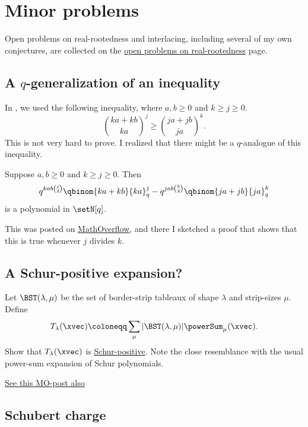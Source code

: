 

\section[personalMinorProblems]{Minor problems}


Open problems on real-rootedness and interlacing, including several of my
own conjectures, are collected on the
\hyperref[realrootedOpenProblems]{open problems on real-rootedness} page.


\subsection[qInequality]{A $q$-generalization of an inequality}

In \cite{AlexanderssonAmini2018}, we used the following inequality,
where $a,b\geq 0$ and $k \geq j \ge 0$.
\[
\binom{ka+kb}{ka}^j \geq \binom{ja+jb}{ja}^k.
\]
This is not very hard to prove. I realized that there might be a $q$-analogue of this inequality.

\begin{conjecture}[Alexandersson, 2019]
Suppose $a,b\geq 0$ and $k \geq j \ge 0$. Then
\[
q^{kab \binom{j}{2}} \qbinom{ka+kb}{ka}_q^j -  q^{jab \binom{k}{2}} \qbinom{ja+jb}{ja}_q^k
\]
is a polynomial in $\setN[q]$.
\end{conjecture}

This was posted on \href{https://mathoverflow.net/questions/330620/q-analogue-of-an-inequality}{MathOverflow},
and there I sketched a proof that shows that this is true whenever $j$ divides $k$.


\subsection[schurPositive]{A Schur-positive expansion?}

Let $\BST(\lambda,\mu)$ be the set of border-strip tableaux of shape $\lambda$
and strip-sizes $\mu$.
Define
\[
T_\lambda(\xvec) \coloneqq \sum_{\mu} |\BST(\lambda,\mu)| \powerSum_\mu(\xvec).
\]
Show that $T_\lambda(\xvec)$ is \hyperref[schurPositivity]{Schur-positive}.
Note the close resemblance with the usual power-sum expansion of Schur polynomials.

\href{https://mathoverflow.net/questions/353150/schur-positive-expression-involving-border-strip-tableaux}{See this MO-post also}


\subsection[schubertCharge]{Schubert charge}

